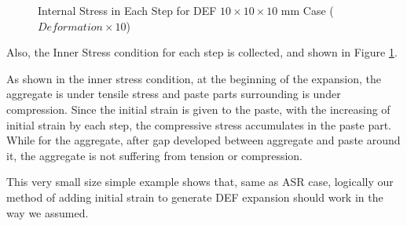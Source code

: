 \begin{figure}[ht!]
      

  \caption{Internal Stress in Each Step for DEF $10 \times 10 \times 10$ mm Case ($Deformation \times 10$)}
  \label{fig:DEF_Small_DEF_IS}
  \end{figure}

Also, the Inner Stress condition for each step is collected, and shown in Figure \ref{fig:DEF_Small_DEF_IS}.

As shown in the inner stress condition, at the beginning of the expansion, the aggregate is under tensile stress and paste parts surrounding is under compression. Since the initial strain is given to the paste, with the increasing of initial strain by each step, the compressive stress accumulates in the paste part. While for the aggregate, after gap developed between aggregate and paste around it, the aggregate is not suffering from tension or compression.

This very small size simple example shows that, same as ASR case, logically our method of adding initial strain to generate DEF expansion should work in the way we assumed.
